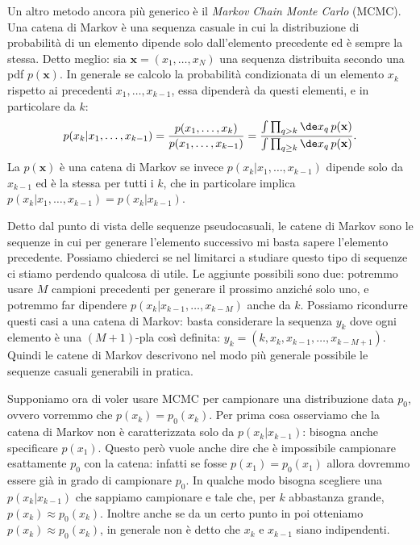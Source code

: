 Un altro metodo ancora più generico è il \emph{Markov Chain Monte Carlo}
(MCMC). Una catena di Markov è una sequenza casuale in cui la distribuzione di
probabilità di un elemento dipende solo dall'elemento precedente ed è sempre la
stessa. Detto meglio: sia $\mathbf x = (x_1,\dots,x_N)$ una sequenza
distribuita secondo una pdf $p(\mathbf x)$. In generale se calcolo la
probabilità condizionata di un elemento $x_k$ rispetto ai precedenti $x_1,
\dots, x_{k-1}$, essa dipenderà da questi elementi, e in particolare da $k$:
\begin{equation}
    p(x_k|x_1,\ldots,x_{k-1})
    = \frac {p(x_1,\ldots,x_k)} {p(x_1,\ldots,x_{k-1})}
    = \frac
    {\int \prod_{q > k} \de x_q\, p(\mathbf x)}
    {\int \prod_{q \ge k} \de x_q\, p(\mathbf x)}.
\end{equation}
La $p(\mathbf x)$ è una catena di Markov se invece $p(x_k|x_1,\ldots,x_{k-1})$
dipende solo da $x_{k-1}$ ed è la stessa per tutti i $k$, che in particolare
implica $p(x_k|x_1,\ldots,x_{k-1}) = p(x_k|x_{k-1})$.

Detto dal punto di vista delle sequenze pseudocasuali, le catene di Markov sono
le sequenze in cui per generare l'elemento successivo mi basta sapere
l'elemento precedente. Possiamo chiederci se nel limitarci a studiare questo
tipo di sequenze ci stiamo perdendo qualcosa di utile. Le aggiunte possibili
sono due: potremmo usare $M$ campioni precedenti per generare il prossimo
anziché solo uno, e potremmo far dipendere $p(x_k|x_{k-1},\dots,x_{k-M})$ anche
da $k$. Possiamo ricondurre questi casi a una catena di Markov: basta
considerare la sequenza $y_k$ dove ogni elemento è una $(M+1)$-pla così
definita: $y_k = (k, x_k, x_{k-1}, \dots, x_{k-M+1})$. Quindi le catene di
Markov descrivono nel modo più generale possibile le sequenze casuali
generabili in pratica.

Supponiamo ora di voler usare MCMC per campionare una distribuzione data $p_0$,
ovvero vorremmo che $p(x_k) = p_0(x_k)$. Per prima cosa osserviamo che la
catena di Markov non è caratterizzata solo da $p(x_k|x_{k-1})$: bisogna anche
specificare $p(x_1)$. Questo però vuole anche dire che è impossibile campionare
esattamente $p_0$ con la catena: infatti se fosse $p(x_1) = p_0(x_1)$ allora
dovremmo essere già in grado di campionare $p_0$. In qualche modo bisogna
scegliere una $p(x_k|x_{k-1})$ che sappiamo campionare e tale che, per $k$
abbastanza grande, $p(x_k) \approx p_0(x_k)$. Inoltre anche se da un certo punto
in poi otteniamo $p(x_k) \approx p_0(x_k)$, in generale non è detto che
$x_k$ e $x_{k-1}$ siano indipendenti.


